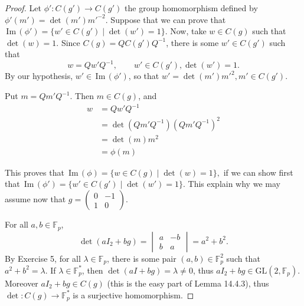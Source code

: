\documentclass[11pt,a4paper]{article}
\newcommand{\F}{\mathbb{F}}
\newcommand{\im}{\,\mathrm{Im}\,}
\begin{document}
{\begin{proof}
Let $\phi' : C(g') \to C(g')$ the group homomorphism defined by $\phi'(m') = \det(m') m'^{-2}$. Suppose that we can prove that $\im(\phi') = \{w' \in C(g') \mid \det(w') = 1\}.$
Now, take $w \in C(g)$ such that $\det(w) = 1$. Since $C(g) = Q C(g') Q^{-1}$,  there is some $w' \in C(g')$ such that
$$w = Q w' Q^{-1},\qquad w' \in C(g'), \det(w') = 1.$$
By our hypothesis, $w' \in \im(\phi')$, so that $w' = \det(m') m'^2, m' \in C(g')$. 

Put $m = Qm' Q^{-1}$. Then $m \in C(g)$, and
\begin{align*}                                                                                                                                                                                                                                                                                                                              
w &= Qw' Q^{-1}\\
&=\det(Qm'Q^{-1}) (Q m'Q^{-1})^2\\
&=\det(m) m^2\\
&= \phi(m)
\end{align*}

This proves that $\im(\phi) = \{w \in C(g) \mid \det(w) = 1\},$ if we can show first that $\im(\phi') = \{w' \in C(g') \mid \det(w') = 1\}.$
This explain why we may assume now that $g = \begin{pmatrix} 0 & -1\\1 & 0 \end{pmatrix}$.

For all $a,b \in \F_p$,
$$\det(aI_2 + b g) = \begin{vmatrix} a & -b\\ b & a \end{vmatrix} = a^2 + b^2.$$
By Exercise 5, for all $\lambda \in \F_p$, there is some pair $(a,b) \in \F_p^2$ such that $a^2  + b^2 = \lambda$. If $\lambda \in \F_p^*$, then $\det(aI + bg) = \lambda \ne 0$, thus 
$aI_2 + bg \in \mathrm{GL}(2,\F_p)$. Moreover $aI_2 + bg  \in C(g)$ (this is the easy part of Lemma 14.4.3), thus $\det : C(g) \to \F_p^*$ is a surjective homomorphism.


\end{proof}}
\end{document}
